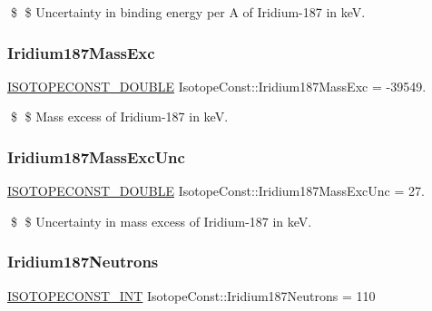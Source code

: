 \$ \$ Uncertainty in binding energy per A of Iridium-\/187 in keV. \mbox{\label{group___isotope_const-_iridium-_ir187_gab1bac001daa5553597be01dc8e91230e}} 
\subsubsection{\texorpdfstring{Iridium187\+Mass\+Exc}{Iridium187MassExc}}
{\footnotesize\ttfamily \mbox{\hyperlink{group___isotope_const-_macros_ga8f45a7272ce02c0b4c65c44636ed719a}{I\+S\+O\+T\+O\+P\+E\+C\+O\+N\+S\+T\+\_\+\+D\+O\+U\+B\+LE}} Isotope\+Const\+::\+Iridium187\+Mass\+Exc = -\/39549.}

\$ \$ Mass excess of Iridium-\/187 in keV. \mbox{\label{group___isotope_const-_iridium-_ir187_gac553ec22c3c4a3c9f20c48f14b9374aa}} 
\subsubsection{\texorpdfstring{Iridium187\+Mass\+Exc\+Unc}{Iridium187MassExcUnc}}
{\footnotesize\ttfamily \mbox{\hyperlink{group___isotope_const-_macros_ga8f45a7272ce02c0b4c65c44636ed719a}{I\+S\+O\+T\+O\+P\+E\+C\+O\+N\+S\+T\+\_\+\+D\+O\+U\+B\+LE}} Isotope\+Const\+::\+Iridium187\+Mass\+Exc\+Unc = 27.}

\$ \$ Uncertainty in mass excess of Iridium-\/187 in keV. \mbox{\label{group___isotope_const-_iridium-_ir187_gae44c9c305ae1497706d6635a55a440f0}} 
\subsubsection{\texorpdfstring{Iridium187\+Neutrons}{Iridium187Neutrons}}
{\footnotesize\ttfamily \mbox{\hyperlink{group___isotope_const-_macros_ga5f18360b3e99483a35c32d789e62621c}{I\+S\+O\+T\+O\+P\+E\+C\+O\+N\+S\+T\+\_\+\+I\+NT}} Isotope\+Const\+::\+Iridium187\+Neutrons = 110}

